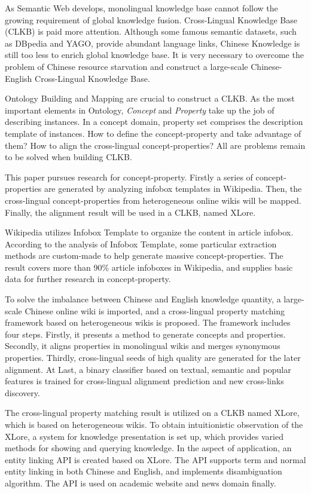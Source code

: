 \begin{eabstract}
As Semantic Web develops, monolingual knowledge base cannot follow the growing requirement of global knowledge fusion. Cross-Lingual Knowledge Base (CLKB) is paid more attention. Although some famous semantic datasets, such as DBpedia and YAGO, provide abundant language links, Chinese Knowledge is still too less to enrich global knowledge base. It is very necessary to overcome the problem of Chinese resource starvation and construct a large-scale Chinese-English Cross-Lingual Knowledge Base.

Ontology Building and Mapping are crucial to construct a CLKB. As the most important elements in Ontology, \textit{Concept} and \textit{Property} take up the job of describing instances. In a concept domain, property set comprises the description template of instances. How to define the concept-property and take advantage of them? How to align the cross-lingual concept-properties? All are problems remain to be solved when building CLKB.

This paper pursues research for concept-property. Firstly a series of concept-properties are generated by analyzing infobox templates in Wikipedia. Then, the cross-lingual concept-properties from heterogeneous online wikis will be mapped. Finally, the alignment result will be used in a CLKB, named XLore.

Wikipedia utilizes Infobox Template to organize the content in article infobox. According to the analysis of Infobox Template, some particular extraction methods are custom-made to help generate massive concept-properties. The result covers more than 90\% article infoboxes in Wikipedia, and supplies basic data for further research in concept-property.

To solve the imbalance between Chinese and English knowledge quantity, a large-scale Chinese online wiki is imported, and a cross-lingual property matching framework based on heterogeneous wikis is proposed. The framework includes four steps. Firstly, it presents a method to generate concepts and properties. Secondly, it aligns properties in monolingual wikis and merges synonymous properties. Thirdly, cross-lingual seeds of high quality are generated for the later alignment. At Last, a binary classifier based on textual, semantic and popular features is trained for cross-lingual alignment prediction and new cross-links discovery.

The cross-lingual property matching result is utilized on a CLKB named XLore, which is based on heterogeneous wikis. To obtain intuitionistic observation of the XLore, a system for knowledge presentation is set up, which provides varied methods for showing and querying knowledge. In the aspect of application, an entity linking API is created based on XLore. The API supports term and normal entity linking in both Chinese and English, and implements disambiguation algorithm. The API is used on academic website and news domain finally.

\end{eabstract}

